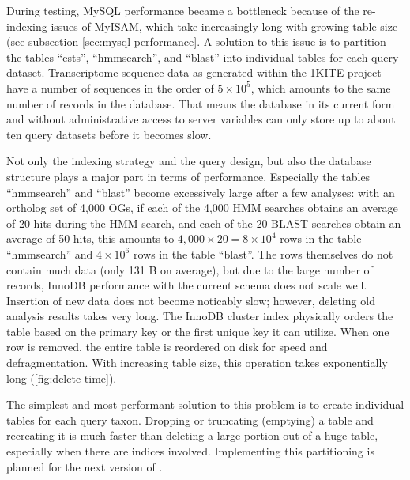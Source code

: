 \label{sec:mysql-performance-discussion}
During testing, MySQL performance became a bottleneck because of the re-indexing
issues of MyISAM, which take increasingly long with growing table size
(see subsection \autoref{sec:mysql-performance}. A solution to this issue is to
partition the tables ``ests'', ``hmmsearch'', and ``blast'' into individual
tables for each query dataset. Transcriptome sequence data as generated within
the 1KITE project have a number of sequences in the order of $5\times10^5$,
which amounts to the same number of records in the database. That means the
database in its current form and without administrative access to server
variables can only store up to about ten query datasets before it becomes slow.

Not only the indexing strategy and the query design, but also the database
structure plays a major part in terms of performance. Especially the tables
``hmmsearch'' and ``blast'' become excessively large after a few analyses: with
an ortholog set of 4,000 OGs, if each of the 4,000 HMM searches obtains an
average of 20 hits during the HMM search, and each of the 20 BLAST searches
obtain an average of 50 hits, this amounts to $4,000 \times 20 = 8 \times 10^4$
rows in the table ``hmmsearch'' and $4 \times 10^6$ rows in the table ``blast''.
The rows themselves do not contain much data (only 131 B on average), but due to
the large number of records, InnoDB performance with the current schema does not
scale well. Insertion of new data does not become noticably slow; however,
deleting old analysis results takes very long. The InnoDB cluster index
physically orders the table based on the primary key or the first unique key it
can utilize. When one row is removed, the entire table is reordered on disk for
speed and defragmentation. With increasing table size, this operation takes
exponentially long (\autoref{fig:delete-time}).

The simplest and most performant solution to this problem is to create
individual tables for each query taxon. Dropping or truncating (emptying) a
table and recreating it is much faster than deleting a large portion out of a
huge table, especially when there are indices involved. Implementing this
partitioning is planned for the next version of \pname.


